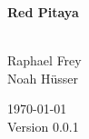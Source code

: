 \documentclass[a4paper,oneside]{alpenthesis/alpenthesis}
\begin{document}
%
%
\begin{titlingpage}
    \flushright\sffamily

    \vspace*{5em}
    \Huge\bfseries{Red Pitaya}\\[1ex]
    \Large{}\\[3ex]

    \normalsize\mdseries

    \vfill
    Raphael Frey\\
    Noah H\"usser\\[3ex]

    \vspace{5em}

    \today\\
    Version 0.0.1
\end{titlingpage} %
%
%
\frontmatter
\tableofcontents*
\clearpage
\listoffigures*
\clearpage
\listoftables*
\clearpage
\listoflistings
\clearpage
%
%
\mainmatter
%
%

%
%
\end{document}
